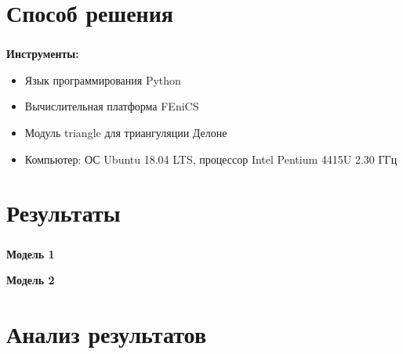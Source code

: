 \section{Способ решения}

\begin{frame}
\frametitle{\insertsection}

\textbf{Инструменты:}
\begin{itemize}
    \item Язык программирования Python
    \item Вычислительная платформа FEniCS
    \item Модуль triangle для триангуляции Делоне
    \item Компьютер: ОС Ubuntu 18.04 LTS, процессор Intel Pentium 4415U 2.30 ГГц
\end{itemize}
\end{frame}


\section{Результаты}

\begin{frame}
\frametitle{\insertsection}

\vspace{-0.5cm}
\begin{minipage}[t]{0.47\linewidth}
    \textbf{Модель 1}
\end{minipage}
\hfill
\begin{minipage}[t]{0.47\linewidth}
    \textbf{Модель 2}
\end{minipage}

\end{frame}


\section{Анализ результатов}

